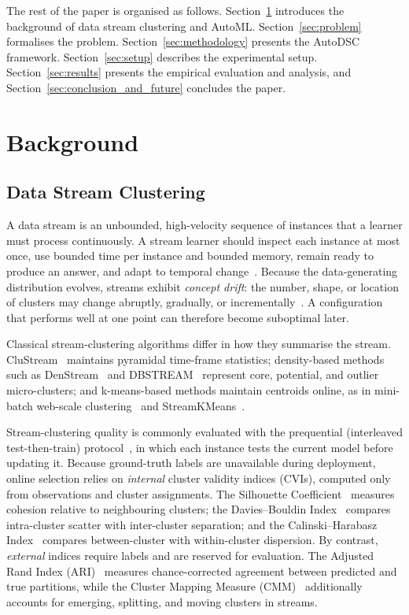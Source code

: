 \documentclass[conference]{IEEEtran}
\begin{document}
The rest of the paper is organised as follows. Section~\ref{sec:background} introduces the background of data stream clustering and AutoML. Section~\ref{sec:problem} formalises the problem. Section~\ref{sec:methodology} presents the AutoDSC framework. Section~\ref{sec:setup} describes the experimental setup. Section~\ref{sec:results} presents the empirical evaluation and analysis, and Section~\ref{sec:conclusion_and_future} concludes the paper.

\section{Background}\label{sec:background}

\subsection{Data Stream Clustering}

A data stream is an unbounded, high-velocity sequence of instances that a learner must process continuously. A stream learner should inspect each instance at most once, use bounded time per instance and bounded memory, remain ready to produce an answer, and adapt to temporal change~\cite{bifet2018machine}. Because the data-generating distribution evolves, streams exhibit \textit{concept drift}: the number, shape, or location of clusters may change abruptly, gradually, or incrementally~\cite{bifet2018machine,aggarwal2007data}. A configuration that performs well at one point can therefore become suboptimal later.

Classical stream-clustering algorithms differ in how they summarise the stream. CluStream~\cite{aggarwal2003framework} maintains pyramidal time-frame statistics; density-based methods such as DenStream~\cite{Cao2006} and DBSTREAM~\cite{Hahsler2016} represent core, potential, and outlier micro-clusters; and k-means-based methods maintain centroids online, as in mini-batch web-scale clustering~\cite{Sculley2010} and StreamKMeans~\cite{montiel2021river}.

Stream-clustering quality is commonly evaluated with the prequential (interleaved test-then-train) protocol~\cite{bifet2018machine}, in which each instance tests the current model before updating it. Because ground-truth labels are unavailable during deployment, online selection relies on \textit{internal} cluster validity indices (CVIs), computed only from observations and cluster assignments. The Silhouette Coefficient~\cite{rousseeuw1987silhouettes} measures cohesion relative to neighbouring clusters; the Davies--Bouldin Index~\cite{davies1979cluster} compares intra-cluster scatter with inter-cluster separation; and the Calinski--Harabasz Index~\cite{calinski1974dendrite} compares between-cluster with within-cluster dispersion. By contrast, \textit{external} indices require labels and are reserved for evaluation. The Adjusted Rand Index (ARI)~\cite{hubert1985comparing,rand1971objective} measures chance-corrected agreement between predicted and true partitions, while the Cluster Mapping Measure (CMM)~\cite{kremer2011cmm} additionally accounts for emerging, splitting, and moving clusters in streams.
\end{document}
